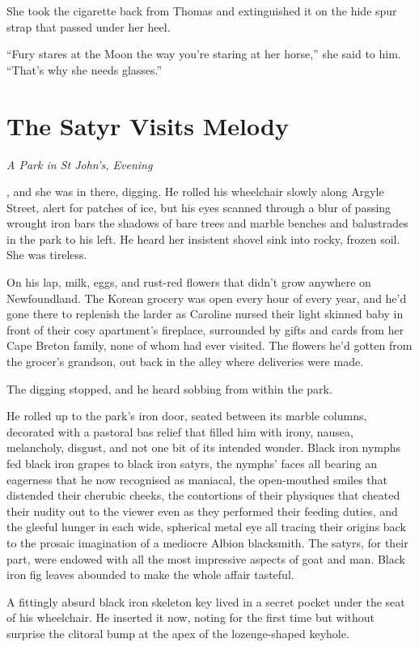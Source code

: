 \documentclass[11pt,a5paper]{article}
\newcommand{\alet}[1]{\textit{#1}\vspace{1em}}
\begin{document}
She took the cigarette back from Thomas and extinguished it on the hide spur strap that passed under her heel.

``Fury stares at the Moon the way you're staring at her horse,'' she said to him. ``That's why she needs glasses.''

\newpage

\section{The Satyr Visits Melody}

\alet{A Park in St John's, Evening}

, and she was in there, digging. He rolled his wheelchair slowly along Argyle Street, alert for patches of ice, but his eyes scanned through a blur of passing wrought iron bars the shadows of bare trees and marble benches and balustrades in the park to his left. He heard her insistent shovel sink into rocky, frozen soil. She was tireless.

On his lap, milk, eggs, and rust-red flowers that didn't grow anywhere on Newfoundland. The Korean grocery was open every hour of every year, and he'd gone there to replenish the larder as Caroline nursed their light skinned baby in front of their cosy apartment's fireplace, surrounded by gifts and cards from her Cape Breton family, none of whom had ever visited. The flowers he'd gotten from the grocer's grandson, out back in the alley where deliveries were made.

The digging stopped, and he heard sobbing from within the park.

He rolled up to the park's iron door, seated between its marble columns, decorated with a pastoral bas relief that filled him with irony, nausea, melancholy, disgust, and not one bit of its intended wonder. Black iron nymphs fed black iron grapes to black iron satyrs, the nymphs' faces all bearing an eagerness that he now recognised as maniacal, the open-mouthed smiles that distended their cherubic cheeks, the contortions of their physiques that cheated their nudity out to the viewer even as they performed their feeding duties, and the gleeful hunger in each wide, spherical metal eye all tracing their origins back to the prosaic imagination of a mediocre Albion blacksmith. The satyrs, for their part, were endowed with all the most impressive aspects of goat and man. Black iron fig leaves abounded to make the whole affair tasteful.

A fittingly absurd black iron skeleton key lived in a secret pocket under the seat of his wheelchair. He inserted it now, noting for the first time but without surprise the clitoral bump at the apex of the lozenge-shaped keyhole.
\end{document}
